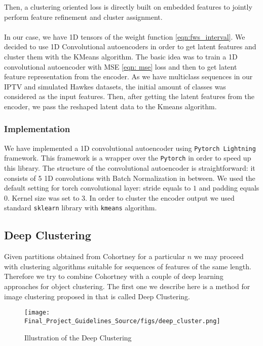 \documentclass[10pt]{article}
\begin{document}
Then, a clustering oriented loss is directly built on embedded features to jointly perform feature refinement and cluster assignment.
\paragraph{}
In our case, we have 1D tensors of the weight function \ref{eqn:fws_interval}. We decided to use 1D Convolutional autoencoders in order to get latent features and cluster them with the KMeans algorithm. The basic idea was to train a 1D convolutional autoencoder with MSE \ref{eqn: mse} loss and then to get latent feature representation from the encoder. As we have multiclass sequences in our IPTV and simulated Hawkes datasets, the initial amount of classes was considered as the input features. Then, after getting the latent features from the encoder, we pass the reshaped latent data to the Kmeans algorithm.

\subsubsection{Implementation}

We have implemented a 1D convolutional autoencoder using \texttt{Pytorch Lightning} framework. This framework is a wrapper over the \texttt{Pytorch} in order to speed up this library. The structure of the convolutional autoencoder is straightforward: it consists of 5 1D convolutions with Batch Normalization in between. We used the default setting for torch convolutional layer: stride equals to $1$ and padding equals $0$. Kernel size was set to $3$. In order to cluster the encoder output we used standard \texttt{sklearn} library with \texttt{kmeans} algorithm.


\subsection{Deep Clustering}\label{sec:deep_cluster}
Given partitions obtained from Cohortney for a particular $n$ we may proceed with clustering algorithms suitable for sequences of features of the same length. Therefore we try to combine Cohortney with a couple of deep learning approaches for object clustering. The first one we describe here is a method for image clustering proposed in \cite{DBLP:journals/corr/abs-1807-05520} that is called Deep Clustering. 

\begin{figure}[h!]
\texttt{[image: Final\_Project\_Guidelines\_Source/figs/deep\_cluster.png]}
\caption{ Illustration of the Deep Clustering}
\label{fig:deep_cluster}
\centering
\end{figure} 
\end{document}
